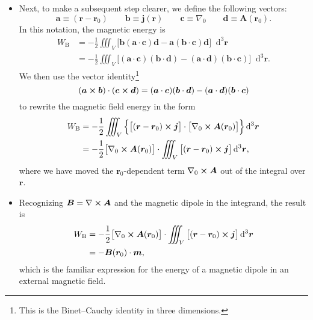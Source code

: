 \documentclass[11pt, a4paper]{article}
\newcommand{\diff}{\mathop{}\!\mathrm{d}} %
\newcommand{\dr}{\diff^{3} \r}  %
\renewcommand{\vec}[1]{\bm{#1}} %
\renewcommand{\r}{\vec{r}}
\newcommand{\B}{\vec{B}} %
\newcommand{\A}{\vec{A}} %
\newcommand{\m}{\vec{m}}  %
\renewcommand{\j}{\vec{j}}  %
\renewcommand{\curl}{\nabla \cross}
\renewcommand{\grad}{\nabla}
\begin{document}
\begin{itemize}
    \item Next, to make a subsequent step clearer, we define the following vectors:
	\begin{equation*}
		\vec{a} \equiv (\r - \r_{0}) \qquad \vec{b} \equiv \j(\r) \qquad \vec{c} \equiv \grad_{0} \qquad \vec{d} \equiv \A(\r_{0}).
	\end{equation*}
	In this notation, the magnetic energy is
	\begin{align*}
		W_{\text{B}} &= -\frac{1}{2}\iiint_{V}\Big[\vec{b}   (\vec{a} \cdot \vec{c}) \vec{d} - \vec{a}(\vec{b}\cdot \vec{c})\vec{d} \Big] \dr\\
		& = -\frac{1}{2}\iiint_{V}\Big[(\vec{a} \cdot \vec{c}) (\vec{b}\cdot\vec{d}) - (\vec{a} \cdot \vec{d}) (\vec{b}\cdot \vec{c}) \Big] \dr.
	\end{align*}
	We then use the vector identity\footnote{This is the Binet–Cauchy identity in three dimensions.}
	\begin{equation*}
		(\vec{a}\cross \vec{b}) \cdot (\vec{c} \cross \vec{d}) = 	(\vec{a}\cdot \vec{c}) (\vec{b} \cdot \vec{d}) - 	(\vec{a}\cdot \vec{d}) (\vec{b} \cdot \vec{c})
	\end{equation*}
	to rewrite the magnetic field energy in the form
	\begin{align*}
		W_{\text{B}} &= - \frac{1}{2}\iiint_{V} \Big\{\big[(\r - \r_{0}) \cross \j\big] \cdot \big[\grad_{0}\cross \A(\r_{0})\big] \Big\}\dr\\
		& = -\frac{1}{2} \big[\grad_{0}\cross \A(\r_{0})\big] \cdot \iiint_{V}\big[(\r - \r_{0}) \cross \j\big] \dr,
	\end{align*}
	where we have moved the $ \r_{0} $-dependent term $ \grad_{0} \cross \A $ out of the integral over $ \r $. 
	
	\item Recognizing $ \B = \curl \A $ and the magnetic dipole in the integrand, the result is
	\begin{align*}
		W_{\text{B}} &=  -\frac{1}{2} \big[\grad_{0}\cross \A(\r_{0})\big] \cdot \iiint_{V}\big[(\r - \r_{0}) \cross \j\big] \dr\\
		&= - \B(\r_{0})  \cdot \m,
	\end{align*}
	which is the familiar expression for the energy of a magnetic dipole in an external magnetic field.
	
\end{itemize}
\end{document}

